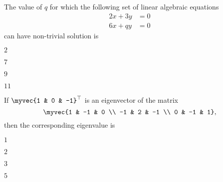 \item The value of $q$ for which the following set of linear algebraic equations
\begin{align*}
2x + 3y &= 0 \\
6x + qy &= 0
\end{align*}
can have non-trivial solution is
\hfill{}
\begin{enumerate}
\begin{multicols}{4}
\item $2$
\item $7$
\item $9$
\item $11$
\end{multicols}
\end{enumerate}
\item If $\myvec{1 & 0 & -1}^{\top}$ is an eigenvector of the matrix
$$ \myvec{1 & -1 & 0 \\ -1 & 2 & -1 \\ 0 & -1 & 1}, $$
then the corresponding eigenvalue is
\hfill{}
\begin{enumerate}
\begin{multicols}{4}
\item $1$
\item $2$
\item $3$
\item $5$
\end{multicols}
\end{enumerate}

